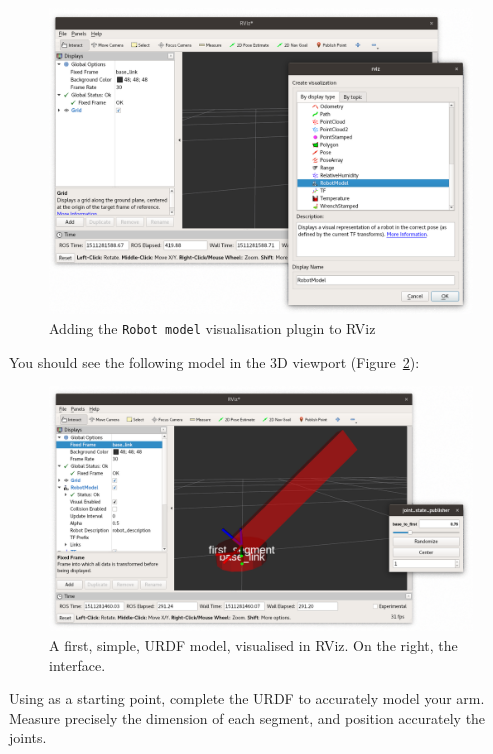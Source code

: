\documentclass{instructions}
\begin{document}
\begin{figure}[h!]
    \centering
    \includegraphics[width=0.52\linewidth]{rviz-plugins}
    \caption{Adding the \texttt{Robot model} visualisation plugin to RViz}
    \label{rviz-robot-model}
\end{figure}

\pagebreak
You should see the following model in the 3D viewport (Figure~\ref{rviz-urdf}):

\begin{figure}[h!]
    \centering
    \includegraphics[width=0.9\linewidth]{urdf-rviz}
    \caption{A first, simple, URDF model, visualised in RViz. On the right, the
     interface.}
    \label{rviz-urdf}
\end{figure}



Using  as a starting point, complete the URDF to accurately
model your arm. Measure precisely the dimension of each segment, and position
accurately the joints.


\end{document}
